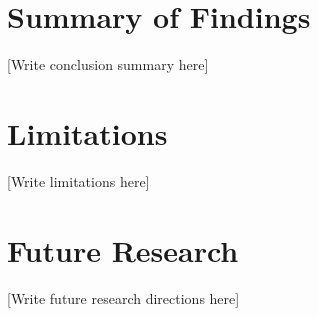 
\section{Summary of Findings}
\label{sec:conclusion_summary}


[Write conclusion summary here]

\section{Limitations}
\label{sec:limitations}


[Write limitations here]

\section{Future Research}
\label{sec:future}


[Write future research directions here]
